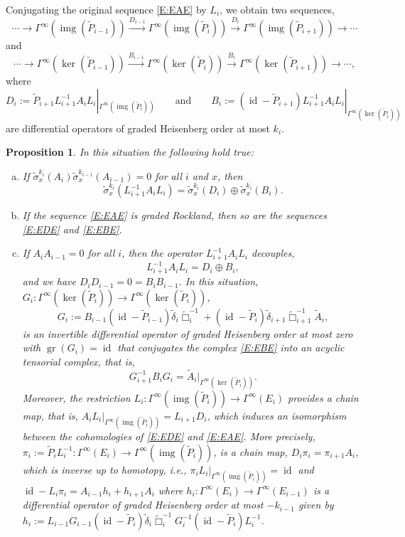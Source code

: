 \documentclass[reqno,12pt]{amsart}
\DeclareMathOperator{\img}{img}
\DeclareMathOperator{\gr}{gr}
\DeclareMathOperator{\id}{id}
\theoremstyle{plain}
\newtheorem{proposition}[theorem]{Proposition}
\theoremstyle{definition}
\begin{document}
Conjugating the original sequence \eqref{E:EAE} by $L_i$, we obtain two sequences,
\begin{equation}\label{E:EDE}
\cdots\to\Gamma^\infty(\img(\tilde P_{i-1}))\xrightarrow{D_{i-1}}\Gamma^\infty(\img(\tilde P_i))\xrightarrow{D_i}\Gamma^\infty(\img(\tilde P_{i+1}))\to\cdots
\end{equation}
and
\begin{equation}\label{E:EBE}
\cdots\to\Gamma^\infty(\ker(\tilde P_{i-1}))\xrightarrow{B_{i-1}}\Gamma^\infty(\ker(\tilde P_i))\xrightarrow{B_i}\Gamma^\infty(\ker(\tilde P_{i+1}))\to\cdots,
\end{equation}
where 
\begin{equation}\label{E:defDB}
D_i:=\tilde P_{i+1}L_{i+1}^{-1}A_iL_i|_{\Gamma^\infty(\img(\tilde P_i))}
\qquad\text{and}\qquad
B_i:=(\id-\tilde P_{i+1})L_{i+1}^{-1}A_iL_i|_{\Gamma^\infty(\ker(\tilde P_i))}
\end{equation}
are differential operators of graded Heisenberg order at most $k_i$.


\begin{proposition}\label{P:DB}
In this situation the following hold true:
\begin{enumerate}[(a)]
\item
If $\tilde\sigma^{k_i}_x(A_i)\tilde\sigma^{k_{i-1}}_x(A_{i-1})=0$ for all $i$ and $x$, then 
$$
\tilde\sigma^{k_i}_x(L^{-1}_{i+1}A_iL_i)=\tilde\sigma^{k_i}_x(D_i)\oplus\tilde\sigma^{k_i}_x(B_i).
$$

\item 
If the sequence \eqref{E:EAE} is graded Rockland, then so are the sequences \eqref{E:EDE} and \eqref{E:EBE}.

\item
If $A_iA_{i-1}=0$ for all $i$, then the operator $L_{i+1}^{-1}A_iL_i$ decouples,
$$
L^{-1}_{i+1}A_iL_i=D_i\oplus B_i,
$$ 
and we have $D_iD_{i-1}=0=B_iB_{i-1}$.
In this situation, $G_i\colon\Gamma^\infty(\ker(\tilde P_i))\to\Gamma^\infty(\ker(\tilde P_i))$,
$$
G_i:=B_{i-1}(\id-\tilde P_{i-1})\tilde\delta_i\tilde\Box_i^{-1}
+(\id-\tilde P_i)\tilde\delta_{i+1}\tilde\Box_{i+1}^{-1}\tilde A_i,
$$ 
is an invertible differential operator of graded Heisenberg order at most zero with $\gr(G_i)=\id$ that conjugates the complex \eqref{E:EBE} into an acyclic tensorial complex, that is, 
$$
G_{i+1}^{-1}B_iG_i=\tilde A_i|_{\Gamma^\infty(\ker(\tilde P_i))}.
$$
Moreover, the restriction $L_i\colon\Gamma^\infty(\img(\tilde P_i))\to\Gamma^\infty(E_i)$ provides a chain map, that is, $A_iL_i|_{\Gamma^\infty(\img(\tilde P_i))}=L_{i+1}D_i$, which induces an isomorphism between the cohomologies of \eqref{E:EDE} and \eqref{E:EAE}.
More precisely, $\pi_i:=\tilde P_iL_i^{-1}\colon\Gamma^\infty(E_i)\to\Gamma^\infty(\img(\tilde P_i))$, is a chain map, $D_i\pi_i=\pi_{i+1}A_i$, which is inverse up to homotopy, i.e., $\pi_iL_i|_{\Gamma^\infty(\img(\tilde P_i))}=\id$ and\/ $\id-L_i\pi_i=A_{i-1}h_i+h_{i+1}A_i$ where $h_i\colon\Gamma^\infty(E_i)\to\Gamma^\infty(E_{i-1})$ is a differential operator of graded Heisenberg order at most $-k_{i-1}$ given by $h_i:=L_{i-1}G_{i-1}(\id-\tilde P_i)\tilde\delta_i\tilde\Box_i^{-1}G_i^{-1}(\id-\tilde P_i)L_i^{-1}$.
\end{enumerate}
\end{proposition}
\end{document}
